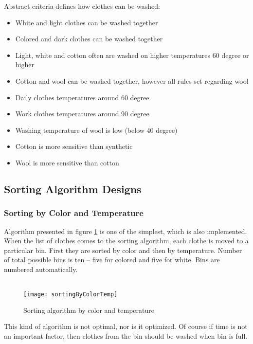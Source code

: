 Abstract criteria defines how clothes can be washed:

\begin{itemize}
	\item White and light clothes can be washed together
	\item Colored and dark clothes can be washed together
	\item Light, white and cotton often are washed on higher temperatures 60 degree or higher
	\item Cotton and wool can be washed together, however all rules set regarding wool
	\item Daily clothes temperatures around 60 degree
	\item Work clothes temperatures around 90 degree
	\item Washing temperature of wool is low (below 40 degree)
	\item Cotton is more sensitive than synthetic
	\item Wool is more sensitive than cotton
\end{itemize}

\subsection{Sorting Algorithm Designs}

\subsubsection{Sorting by Color and Temperature}

Algorithm presented in figure \ref{fig:sortingByColorTemp} is one of the simplest, which is also implemented. When the list of clothes comes to the sorting algorithm, each clothe is moved to a particular bin. First they are sorted by color and then by temperature. Number of total possible bins is ten – five for colored and five for white. Bins are numbered automatically. \\ \\

\begin{figure}[h]
	\centering
		\texttt{[image: sortingByColorTemp]}
	\caption{Sorting algorithm by color and temperature}
	\label{fig:sortingByColorTemp}
\end{figure}

This kind of algorithm is not optimal, nor is it optimized. Of course if time is not an important factor, then clothes from the bin should be washed when bin is full.

